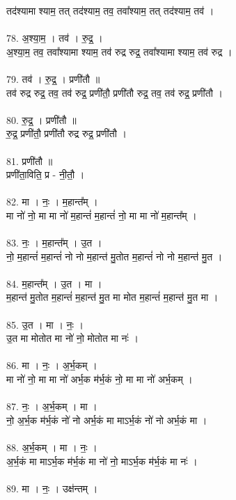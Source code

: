 तद॑श्यामा श्याम॒ तत् तद॑श्याम॒ तव॒ तवा᳚श्याम॒ तत् तद॑श्याम॒ तव॑ ।\\
\\
78. अ॒श्या॒म॒ । तव॑ । रु॒द्र॒ ।\\
अ॒श्या॒म॒ तव॒ तवा᳚श्यामा श्याम॒ तव॑ रुद्र रुद्र॒ तवा᳚श्यामा श्याम॒ तव॑ रुद्र ।\\
\\
79. तव॑ । रु॒द्र॒ । प्रणी॑तौ ॥\\
तव॑ रुद्र रुद्र॒ तव॒ तव॑ रुद्र॒ प्रणी॑तौ॒ प्रणी॑तौ रुद्र॒ तव॒ तव॑ रुद्र॒ प्रणी॑तौ ।\\
\\
80. रु॒द्र॒ । प्रणी॑तौ ॥\\
रु॒द्र॒ प्रणी॑तौ॒ प्रणी॑तौ रुद्र रुद्र॒ प्रणी॑तौ ।\\
\\
81. प्रणी॑तौ ॥\\
प्रणी॑ता॒विति॒ प्र - नी॒तौ॒ ।\\
\\
82. मा । नः॒ । म॒हान्त᳚म् ।\\
मा नो॑ नो॒ मा मा नो॑ म॒हान्तं॑ म॒हान्तं॑ नो॒ मा मा नो॑ म॒हान्त᳚म् ।\\
\\
83. नः॒ । म॒हान्त᳚म् । उ॒त ।\\
नो॒ म॒हान्तं॑ म॒हान्तं॑ नो नो म॒हान्त॑ मु॒तोत म॒हान्तं॑ नो नो म॒हान्त॑ मु॒त ।\\
\\
84. म॒हान्त᳚म् । उ॒त । मा ।\\
म॒हान्त॑ मु॒तोत म॒हान्तं॑ म॒हान्त॑ मु॒त मा मोत म॒हान्तं॑ म॒हान्त॑ मु॒त मा ।\\
\\
85. उ॒त । मा । नः॒ ।\\
उ॒त मा मोतोत मा नो॑ नो॒ मोतोत मा नः॑ ।\\
\\
86. मा । नः॒ । अ॒र्भ॒कम् ।\\
मा नो॑ नो॒ मा मा नो॑ अर्भ॒क म॑र्भ॒कं नो॒ मा मा नो॑ अर्भ॒कम् ।\\
\\
87. नः॒ । अ॒र्भ॒कम् । मा ।\\
नो॒ अ॒र्भ॒क म॑र्भ॒कं नो॑ नो अर्भ॒कं मा माऽर्भ॒कं नो॑ नो अर्भ॒कं मा ।\\
\\
88. अ॒र्भ॒कम् । मा । नः॒ ।\\
अ॒र्भ॒कं मा माऽर्भ॒क म॑र्भ॒कं मा नो॑ नो॒ माऽर्भ॒क म॑र्भ॒कं मा नः॑ ।\\
\\
89. मा । नः॒ । उक्ष॑न्तम् ।\\
